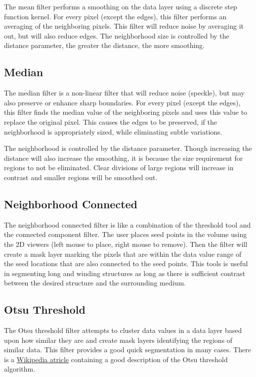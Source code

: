 \documentclass[fleqn,11pt,openany]{book}
\begin{document}
The mean filter performs a smoothing on the data layer using a discrete step function kernel.  For every pixel (except the edges), this filter performs an averaging of the neighboring pixels.  This filter will reduce noise by averaging it out, but will also reduce edges.  The neighborhood size is controlled by the distance parameter, the greater the distance, the more smoothing.

\subsection{Median}

The median filter is a non-linear filter that will reduce noise (speckle), but may also preserve or enhance sharp boundaries. For every pixel (except the edges), this filter finds the median value of the neighboring pixels and uses this value to replace the original pixel.  This causes the edges to be preserved, if the neighborhood is appropriately sized, while eliminating subtle variations.  

The neighborhood is controlled by the distance parameter.  Though increasing the distance will also increase the smoothing, it is because the size requirement for regions to not be eliminated.  Clear divisions of large regions will increase in contrast and smaller regions will be smoothed out.  

\subsection{Neighborhood Connected}

The neighborhood connected filter is like a combination of the threshold tool and the connected component filter.  The user places seed points in the volume using the 2D viewers (left mouse to place, right mouse to remove).  Then the filter will create a mask layer marking the pixels that are within the data value range of the seed locations that are also connected to the seed points.  This tools is useful in segmenting long and winding structures as long as there is sufficient contrast between the desired structure and the surrounding medium.  

\subsection{Otsu Threshold}

The Otsu threshold filter attempts to cluster data values in a data layer based upon how similar they are and create mask layers identifying the regions of similar data.  This filter provides a good quick segmentation in many cases.  There is a \href{http://en.wikipedia.org/wiki/Otsu's_method}{Wikipedia atricle} containing a good description of the Otsu threshold algorithm.
\end{document}
